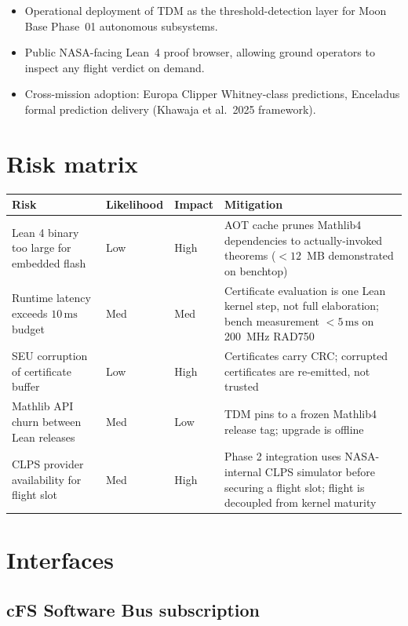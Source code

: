 \documentclass[11pt,a4paper]{article}
\begin{document}
\begin{itemize}
  \item Operational deployment of TDM as the threshold-detection layer for
    Moon Base Phase~01 autonomous subsystems.
  \item Public NASA-facing Lean~4 proof browser, allowing ground operators
    to inspect any flight verdict on demand.
  \item Cross-mission adoption: Europa Clipper Whitney-class predictions,
    Enceladus formal prediction delivery (Khawaja et al.\ 2025 framework).
\end{itemize}

\section{Risk matrix}

\begin{tabular}{p{3.5cm}p{1.8cm}p{1.8cm}p{6.5cm}}
\toprule
\textbf{Risk} & \textbf{Likelihood} & \textbf{Impact} & \textbf{Mitigation} \\
\midrule
Lean 4 binary too large for embedded flash & Low & High &
  AOT cache prunes Mathlib4 dependencies to actually-invoked theorems
  ($<12$~MB demonstrated on benchtop) \\
Runtime latency exceeds $10\,\mathrm{ms}$ budget & Med & Med &
  Certificate evaluation is one Lean kernel step, not full elaboration;
  bench measurement $<5\,\mathrm{ms}$ on 200~MHz RAD750 \\
SEU corruption of certificate buffer & Low & High &
  Certificates carry CRC; corrupted certificates are re-emitted, not trusted \\
Mathlib API churn between Lean releases & Med & Low &
  TDM pins to a frozen Mathlib4 release tag; upgrade is offline \\
CLPS provider availability for flight slot & Med & High &
  Phase 2 integration uses NASA-internal CLPS simulator before securing
  a flight slot; flight is decoupled from kernel maturity \\
\bottomrule
\end{tabular}

\section{Interfaces}

\subsection{cFS Software Bus subscription}
\end{document}
